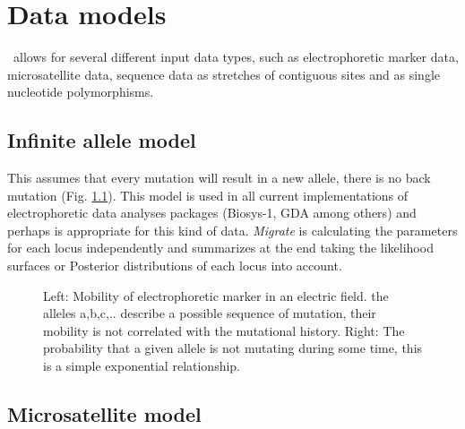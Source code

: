 \chapter{Data models}


\migrate\ allows for several different input data types, such as electrophoretic marker data, microsatellite data, sequence data as stretches of contiguous sites and as single nucleotide polymorphisms.
 
\section{Infinite allele model}
This assumes 
that every 
mutation will 
result in a new 
allele, there is no back mutation (Fig. \ref{EPFIG}). This model is used in all current implementations of electrophoretic data analyses packages (Biosys-1, GDA among others)
and perhaps is appropriate for this kind of data. {\it Migrate} is calculating the parameters for 
each locus independently and summarizes at the end taking the likelihood surfaces or Posterior distributions of each locus into account.
\begin{figure}[thb]
\begin{center}
\end{center}
\caption{Left: Mobility of electrophoretic marker in an electric field. the alleles a,b,c,.. describe a possible sequence of mutation, their mobility is not correlated with the mutational history. Right: The probability that a given allele is not mutating during some time, 
this is a simple exponential relationship.}
\label{EPFIG}
\end{figure}
\newpage
\section{Microsatellite model}
